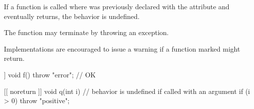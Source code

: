 \pnum
If a function  is called where  was previously declared with the 
attribute and  eventually returns, the behavior is undefined. \begin{note} The function may
terminate by throwing an exception. \end{note} \begin{note} Implementations are encouraged to issue a
warning if a function marked \tcode{[[noreturn]]} might return. \end{note}

\pnum
\begin{example}
\begin{codeblock}
[[ noreturn ]] void f() {
  throw "error";        // OK
}

[[ noreturn ]] void q(int i) { // behavior is undefined if called with an argument 
  if (i > 0)
    throw "positive";
}
\end{codeblock}
\end{example}
